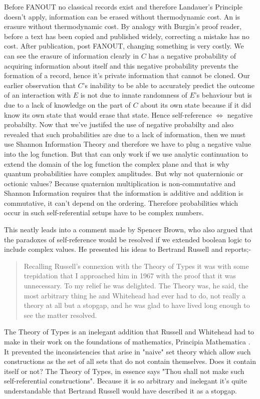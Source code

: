 \documentclass{article}
\begin{document}
Before FANOUT no classical records exist and therefore Landauer's Principle doesn't apply, information can be erased without thermodynamic cost. An  is erasure without thermodynamic cost. By analogy with Burgin's proof reader, before a text has been copied and published widely, correcting a mistake has no cost. After publication, post FANOUT,  changing something is very costly. We can see the erasure of information clearly in  $C$ has a negative probability of acquiring information about itself and this negative probability prevents the formation of a record, hence it's private information that cannot be cloned. Our earlier observation that $C$'s inability to be able to accurately predict the outcome of an interaction with $E$ is not due to innate randomness of $E$'s behaviour but is due to a lack of knowledge on the part of $C$ about its own state because if it did know its own state that would erase that state. Hence self-reference $\iff$ negative probabilty. Now that we've justifed the use of negative probabilty and also revealed that such probabilities are due to a lack of information, then we must use Shannon Information Theory and therefore we have to plug a negative value into the log function. But that can only work if we use analytic continuation to extend the domain of the log function the complex plane and that is why quantum probabilities have complex amplitudes. But why not quaternionic or octionic values? Because quaternion multiplication is non-commutative and Shannon Information requires that the information is additive and addition is commutative, it can't depend on the ordering. Therefore probabilities which occur in such self-referential setups have to be complex numbers. 

This neatly leads into a comment made by Spencer Brown, who also argued that the paradoxes of self-reference would be resolved if we extended boolean logic to include complex values. He presented his ideas to Bertrand Russell and reports;-
\begin{quotation}
    Recalling Russell's connexion with the Theory of Types it was with some trepidation that I approached him in 1967 with the proof that it was unnecessary. To my relief he was delighted. The Theory was, he said, the most arbitrary thing he and Whitehead had ever had to do, not really a theory at all but a stopgap, and he was glad to have lived long enough to see the matter resolved. 
    \hfill \autocite[ix]{Spence-Brown-1969}
\end{quotation}
The Theory of Types is an inelegant addition that Russell and Whitehead had to make in their work on the foundations of mathematics, Principia Mathematica \autocite{russell_2010}. It prevented the inconsistencies that arise in "naive" set theory which allow such constructions as the set of all sets that do not contain themselves. Does it contain itself or not? The Theory of Types, in essence says "Thou shall not make such self-referential constructions". Because it is so arbitrary and inelegant it's quite understandable that Bertrand Russell would have described it as a stopgap. 
\end{document}
